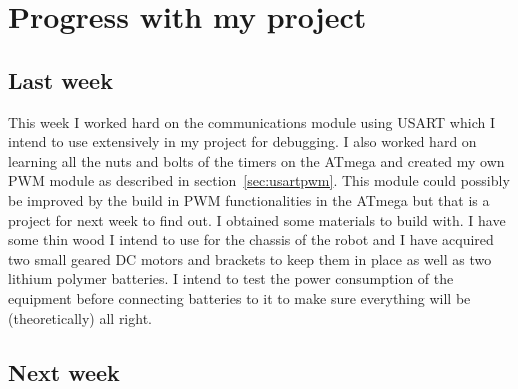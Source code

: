 \documentclass[11pt,a4paper,titlepage]{article}
\begin{document}
	
		
	
	\pagebreak
	\section{Progress with my project}
	
	\subsection{Last week}
	This week I worked hard on the communications module using USART which I intend to use extensively in my project for debugging. I also worked hard on learning all the nuts and bolts of the timers on the ATmega and created my own PWM module as described in section~\ref{sec:usartpwm}. This module could possibly be improved by the build in PWM functionalities in the ATmega but that is a project for next week to find out. I obtained some materials to build with. I have some thin wood I intend to use for the chassis of the robot and I have acquired two small geared DC motors and brackets to keep them in place as well as two lithium polymer batteries. I intend to test the power consumption of the equipment before connecting batteries to it to make sure everything will be (theoretically) all right. 
	
	
	\subsection{Next week}
	
\end{document}
